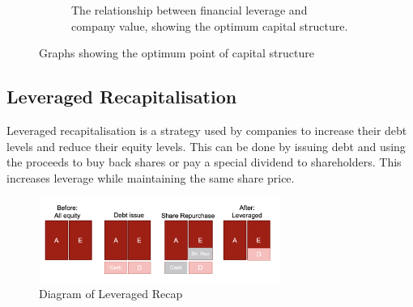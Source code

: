 \begin{figure}[H]
\begin{subfigure}{0.55\textwidth}
        \caption{The relationship between financial leverage and company value, showing the optimum capital structure.}
    \end{subfigure}
    \caption{Graphs showing the optimum point of capital structure}
\end{figure}


\subsection*{Leveraged Recapitalisation}
Leveraged recapitalisation is a strategy used by companies to increase their debt levels and reduce their equity levels. This can be done by issuing debt and using the proceeds to buy back shares or pay a special dividend to shareholders. This increases leverage while maintaining the same share price. 

\begin{figure}[H]
    \centering
    \includegraphics[width=0.7\textwidth]{img/8.4.3.png}
    \caption{Diagram of Leveraged Recap}
\end{figure}

